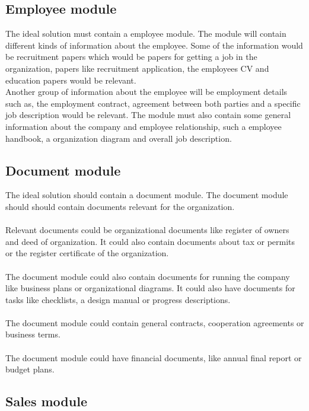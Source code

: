 \subsection{Employee module}
The ideal solution must contain a employee module. The module will contain different kinds of information about the employee. Some of the information would be recruitment papers which would be papers for getting a job in the organization, papers like recruitment application, the employees CV and education papers would be relevant. \\
Another group of information about the employee will be employment details such as, the employment contract, agreement between both parties and a specific job description would be relevant. The module must also contain some general information about the company and employee relationship, such a employee handbook, a organization diagram and overall job description.

\subsection{Document module}

The ideal solution should contain a document module. The document module should should contain documents relevant for the organization.\\
\\
Relevant documents could be organizational documents like register of owners and deed of organization. It could also contain documents about tax or permits or the register certificate of the organization.\\
\\
The document module could also contain documents for running the company like business plans or organizational diagrams. It could also have documents for tasks like checklists, a design manual or progress descriptions.\\
\\
The document module could contain general contracts, cooperation agreements or business terms.\\
\\
The document module could have financial documents, like annual final report or budget plans.

\subsection{Sales module}